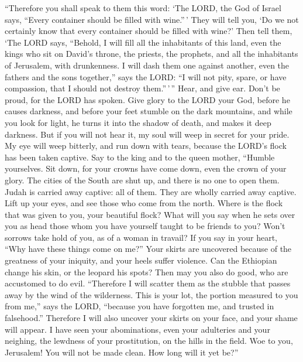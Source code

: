  ``Therefore you shall speak to them this word: `The
LORD, the God of Israel says, ``Every container should be filled with
wine.''\,' They will tell you, `Do we not certainly know that every
container should be filled with wine?'  Then tell them,
`The LORD says, ``Behold, I will fill all the inhabitants of this land,
even the kings who sit on David's throne, the priests, the prophets, and
all the inhabitants of Jerusalem, with drunkenness.  I
will dash them one against another, even the fathers and the sons
together,'' says the LORD: ``I will not pity, spare, or have compassion,
that I should not destroy them.''\,'\,''  Hear, and give
ear. Don't be proud, for the LORD has spoken.  Give glory
to the LORD your God, before he causes darkness, and before your feet
stumble on the dark mountains, and while you look for light, he turns it
into the shadow of death, and makes it deep darkness. 
But if you will not hear it, my soul will weep in secret for your pride.
My eye will weep bitterly, and run down with tears, because the LORD's
flock has been taken captive.  Say to the king and to the
queen mother, ``Humble yourselves. Sit down, for your crowns have come
down, even the crown of your glory.  The cities of the
South are shut up, and there is no one to open them. Judah is carried
away captive: all of them. They are wholly carried away captive.
 Lift up your eyes, and see those who come from the
north. Where is the flock that was given to you, your beautiful flock?
 What will you say when he sets over you as head those
whom you have yourself taught to be friends to you? Won't sorrows take
hold of you, as of a woman in travail?  If you say in
your heart, ``Why have these things come on me?'' Your skirts are
uncovered because of the greatness of your iniquity, and your heels
suffer violence.  Can the Ethiopian change his skin, or
the leopard his spots? Then may you also do good, who are accustomed to
do evil.  ``Therefore I will scatter them as the stubble
that passes away by the wind of the wilderness.  This is
your lot, the portion measured to you from me,'' says the LORD,
``because you have forgotten me, and trusted in falsehood.''
 Therefore I will also uncover your skirts on your face,
and your shame will appear.  I have seen your
abominations, even your adulteries and your neighing, the lewdness of
your prostitution, on the hills in the field. Woe to you, Jerusalem! You
will not be made clean. How long will it yet be?''


